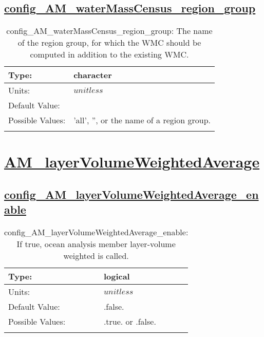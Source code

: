 \subsection[config\_AM\_waterMassCensus\_region\_group]{\hyperref[sec:nm_tab_AM_waterMassCensus]{config\_AM\_waterMassCensus\_region\_group}}
\label{subsec:nm_sec_config_AM_waterMassCensus_region_group}
\begin{center}
\begin{longtable}{| p{2.0in} || p{4.0in} |}
    \hline
    Type: & character \\
    \hline
    Units: & $unitless$ \\
    \hline
    Default Value: &  \\
    \hline
    Possible Values: & 'all', '', or the name of a region group. \\
    \hline
    \caption{config\_AM\_waterMassCensus\_region\_group: The name of the region group, for which the WMC should be computed in addition to the existing WMC.}
\end{longtable}
\end{center}
\section[AM\_layerVolumeWeightedAverage]{\hyperref[sec:nm_tab_AM_layerVolumeWeightedAverage]{AM\_layerVolumeWeightedAverage}}
\label{sec:nm_sec_AM_layerVolumeWeightedAverage}
\subsection[config\_AM\_layerVolumeWeightedAverage\_enable]{\hyperref[sec:nm_tab_AM_layerVolumeWeightedAverage]{config\_AM\_layerVolumeWeightedAverage\_enable}}
\label{subsec:nm_sec_config_AM_layerVolumeWeightedAverage_enable}
\begin{center}
\begin{longtable}{| p{2.0in} || p{4.0in} |}
    \hline
    Type: & logical \\
    \hline
    Units: & $unitless$ \\
    \hline
    Default Value: & .false. \\
    \hline
    Possible Values: & .true. or .false. \\
    \hline
    \caption{config\_AM\_layerVolumeWeightedAverage\_enable: If true, ocean analysis member layer-volume weighted is called.}
\end{longtable}
\end{center}
